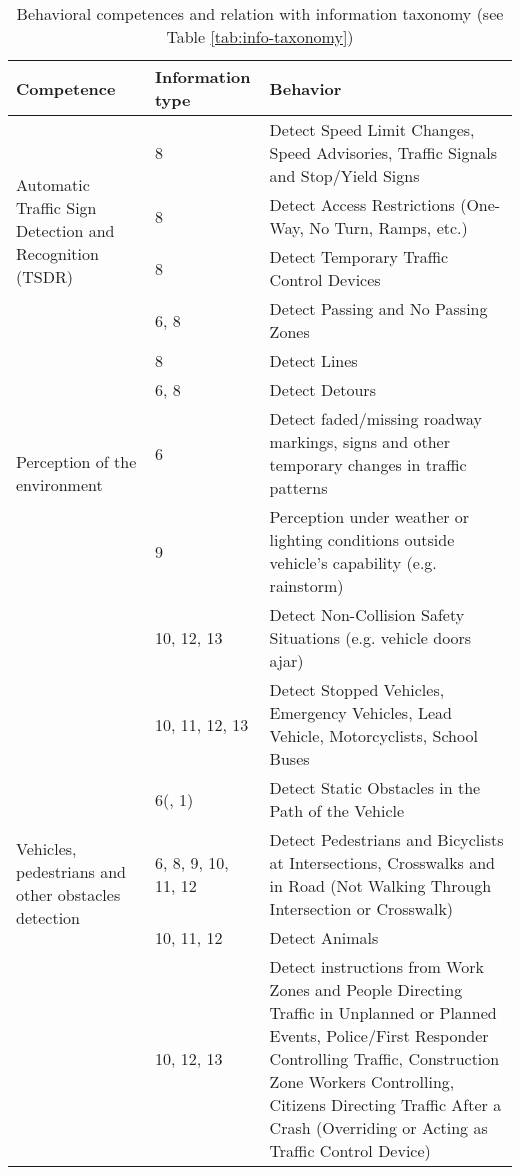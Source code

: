 \begin{table*} %
    \caption{Behavioral competences and relation with information taxonomy 
        (see Table \ref{tab:info-taxonomy})}
    \label{tab:behavioral-competences}
    \begin{tabular*}{\textwidth}{m{4cm} l p{11cm}}%
        \hline %
        \textbf{Competence}	& \textbf{Information type} & \textbf{Behavior}	
        \\
        \hline %
        \multirow{4}{4cm}{Automatic Traffic Sign Detection
                         and Recognition (TSDR)}
         & 8    & Detect Speed Limit Changes, Speed Advisories, Traffic Signals 
         and Stop/Yield Signs \\
         & 8    & Detect Access Restrictions (One-Way, No Turn, Ramps, etc.) \\
         & 8    & Detect Temporary Traffic Control Devices \\
         & 6, 8 & Detect Passing and No Passing Zones  \\
         \hline %
         \multirow{4}{*}{Perception of the environment}
         & 8 & Detect Lines \\
         & 6, 8 & Detect Detours  \\
         & 6 & Detect faded/missing roadway markings, signs and other 
         temporary changes in traffic patterns \\
         & 9 & Perception under weather or lighting conditions 
         outside 
         vehicle’s capability (e.g. rainstorm) \\
         \hline %
         \multirow{6}{4cm}{Vehicles, pedestrians and other obstacles 
         detection}
         & 10, 12, 13 & Detect Non-Collision Safety Situations (e.g. vehicle 
         doors ajar) \\
         & 10, 11, 12, 13 & Detect Stopped Vehicles, Emergency Vehicles, Lead 
         Vehicle, Motorcyclists, School Buses \\
         & 6(, 1)  & Detect Static Obstacles in the Path of the Vehicle \\
         & 6, 8, 9, 10, 11, 12 & Detect Pedestrians and Bicyclists at 
         Intersections, Crosswalks and in Road (Not Walking Through 
         Intersection or Crosswalk) \\
         & 10, 11, 12 & Detect Animals \\
         & 10, 12, 13 & Detect instructions from Work Zones and People 
         Directing Traffic in Unplanned or Planned Events, Police/First 
         Responder Controlling Traffic, Construction Zone Workers Controlling, 
         Citizens Directing Traffic After a Crash (Overriding or Acting as 
         Traffic Control Device) \\

        \hline %
    \end{tabular*}
\end{table*}
